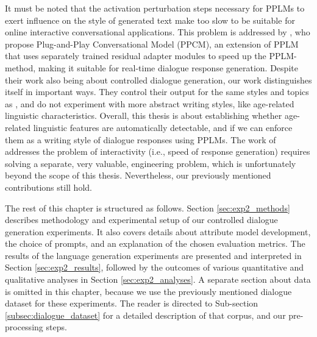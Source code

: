 

It must be noted that the activation perturbation steps necessary for PPLMs to exert influence on the style of generated text make too slow to be suitable for online interactive conversational applications. This problem is addressed by \cite{madotto-etal-2020-plug}, who propose Plug-and-Play Conversational Model (PPCM), an extension of PPLM that uses separately trained residual adapter modules to speed up the PPLM-method, making it suitable for real-time dialogue response generation. Despite their work also being about controlled dialogue generation, our work distinguishes itself in important ways. They control their output for the same styles and topics as \cite{dathathri2019plug}, and do not experiment with more abstract writing styles, like age-related linguistic characteristics. Overall, this thesis is about establishing whether age-related linguistic features are automatically detectable, and if we can enforce them as a writing style of dialogue responses using PPLMs. The work of \cite{madotto-etal-2020-plug} addresses the problem of interactivity (i.e., speed of response generation) requires solving a separate, very valuable, engineering problem, which is unfortunately beyond the scope of this thesis. Nevertheless, our previously mentioned contributions still hold.

The rest of this chapter is structured as follows. Section \ref{sec:exp2_methods} describes methodology and experimental setup of our controlled dialogue generation experiments. It also covers details about attribute model development, the choice of prompts, and an explanation of the chosen evaluation metrics. The results of the language generation experiments are presented and interpreted in Section \ref{sec:exp2_results}, followed by the outcomes of various quantitative and qualitative analyses in Section \ref{sec:exp2_analyses}. A separate section about data is omitted in this chapter, because we use the previously mentioned dialogue dataset for these experiments. The reader is directed to Sub-section \ref{subsec:dialogue_dataset} for a detailed description of that corpus, and our pre-processing steps.



